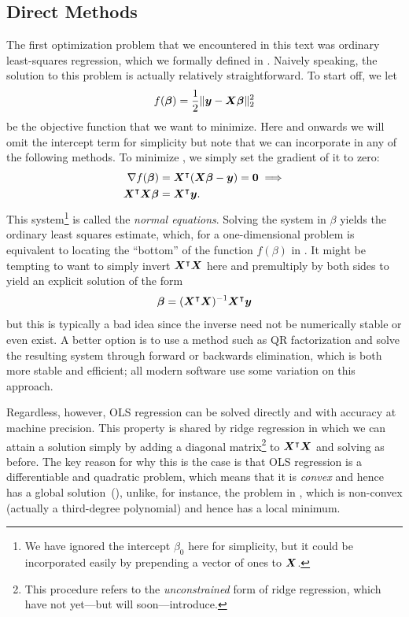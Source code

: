 \subsection{Direct Methods}

The first optimization problem that we encountered in this text was ordinary least-squares regression, which we formally defined in . Naively speaking, the solution to this problem is actually relatively straightforward. To start off, we let
\begin{equation}
  \label{eq:ols-obj}
  f(\boldsymbol{\beta}) = \frac{1}{2}\lVert \boldsymbol{y} - \boldsymbol{X}\boldsymbol{\beta}\rVert_2^2
\end{equation}
be the objective function that we want to minimize. Here and onwards we will omit the intercept term for simplicity but note that we can incorporate in any of the following methods. To minimize , we simply set the gradient of it to zero:
\[
  \begin{aligned}
    \nabla f(\boldsymbol{\beta})                & = \boldsymbol{X}^\intercal (\boldsymbol{X}\boldsymbol{\beta} - \boldsymbol{y}) = \boldsymbol{0} \implies \\
    \boldsymbol{X}^\intercal \boldsymbol{X}\boldsymbol{\beta} & = \boldsymbol{X}^\intercal \boldsymbol{y}.
  \end{aligned}
\]
This system\footnote{We have ignored the intercept \(\beta_0\) here for simplicity, but it could be incorporated easily by prepending a vector of ones to \(\boldsymbol{X}\).} is called the \emph{normal equations}. Solving the system in \(\beta\) yields the ordinary least squares estimate, which, for a one-dimensional problem is equivalent to locating the ``bottom'' of the function \(f(\beta)\) in . It might be tempting to want to simply invert \(\boldsymbol{X}^\intercal\boldsymbol{X}\) here and premultiply by both sides to yield an explicit solution of the form
\[
  \boldsymbol{\beta} = (\boldsymbol{X}^\intercal\boldsymbol{X})^{-1}\boldsymbol{X}^\intercal\boldsymbol{y}
\]
but this is typically a bad idea since the inverse need not be numerically stable or even exist. A better option is to use a method such as QR factorization and solve the resulting system through forward or backwards elimination, which is both more stable and efficient; all modern software use some variation on this approach.

Regardless, however, OLS regression can be solved directly and with accuracy at machine precision. This property is shared by ridge regression in which we can attain a solution simply by adding a diagonal matrix\footnote{This procedure refers to the \emph{unconstrained} form of ridge regression, which have not yet---but will soon---introduce.} to \(\boldsymbol{X}^\intercal\boldsymbol{X}\) and solving as before. The key reason for why this is the case is that OLS regression is a differentiable and quadratic problem, which means that it is \emph{convex} and hence has a global solution~(), unlike, for instance, the problem in , which is non-convex (actually a third-degree polynomial) and hence has a local minimum.

